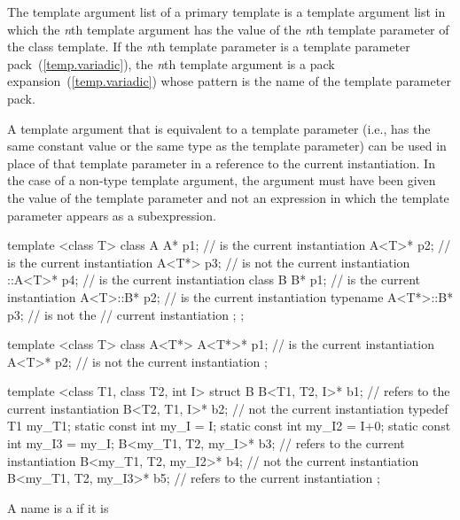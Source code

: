 \pnum
The template argument list of a primary template is a
template argument list in which the
\textit{n}th
template argument has the value of the
\textit{n}th
template parameter of the class template.
If the \textit{n}th template parameter is a template
parameter pack~(\ref{temp.variadic}), the \textit{n}th template argument is a pack
expansion~(\ref{temp.variadic}) whose pattern is the name of
the template parameter pack.

\pnum
A template argument that is equivalent to a template
parameter (i.e., has the same constant value or the same type
as the template parameter) can be used in place of that
template parameter in a reference to the current
instantiation. In the case of a non-type template argument,
the argument must have been given the value of the
template parameter and not an expression in which the
template parameter appears as a subexpression.
\enterexample
\begin{codeblock}
template <class T> class A {
  A* p1;                        //  is the current instantiation
  A<T>* p2;                     //  is the current instantiation
  A<T*> p3;                     //  is not the current instantiation
  ::A<T>* p4;                   //  is the current instantiation
  class B {
    B* p1;                      //  is the current instantiation
    A<T>::B* p2;                //  is the current instantiation
    typename A<T*>::B* p3;      //  is not the
                                // current instantiation
  };
};

template <class T> class A<T*> {
  A<T*>* p1;                    //  is the current instantiation
  A<T>* p2;                     //  is not the current instantiation
};

template <class T1, class T2, int I> struct B {
  B<T1, T2, I>* b1;             // refers to the current instantiation
  B<T2, T1, I>* b2;             // not the current instantiation
  typedef T1 my_T1;
  static const int my_I = I;
  static const int my_I2 = I+0;
  static const int my_I3 = my_I;
  B<my_T1, T2, my_I>* b3;       // refers to the current instantiation
  B<my_T1, T2, my_I2>* b4;      // not the current instantiation
  B<my_T1, T2, my_I3>* b5;      // refers to the current instantiation
};
\end{codeblock}
\exitexample

\pnum
{}%
A name is a
if it is

